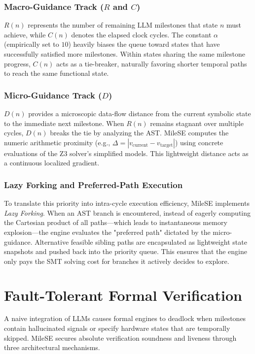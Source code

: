 \subsubsection{Macro-Guidance Track ($R$ and $C$)}
$R(n)$ represents the number of remaining LLM milestones that state $n$ must achieve, while $C(n)$ denotes the elapsed clock cycles. The constant $\alpha$ (empirically set to $10$) heavily biases the queue toward states that have successfully satisfied more milestones. Within states sharing the same milestone progress, $C(n)$ acts as a tie-breaker, naturally favoring shorter temporal paths to reach the same functional state.

\subsubsection{Micro-Guidance Track ($D$)}
$D(n)$ provides a microscopic data-flow distance from the current symbolic state to the immediate next milestone. When $R(n)$ remains stagnant over multiple cycles, $D(n)$ breaks the tie by analyzing the AST. MileSE computes the numeric arithmetic proximity (e.g., $\Delta = |v_{\text{current}} - v_{\text{target}}|$) using concrete evaluations of the Z3 solver's simplified models. This lightweight distance acts as a continuous localized gradient.

\subsubsection{Lazy Forking and Preferred-Path Execution}
To translate this priority into intra-cycle execution efficiency, MileSE implements \textit{Lazy Forking}. When an AST branch is encountered, instead of eagerly computing the Cartesian product of all paths—which leads to instantaneous memory explosion—the engine evaluates the "preferred path" dictated by the micro-guidance. Alternative feasible sibling paths are encapsulated as lightweight state snapshots and pushed back into the priority queue. This ensures that the engine only pays the SMT solving cost for branches it actively decides to explore.

\section{Fault-Tolerant Formal Verification}
\label{sec:fault_tolerance}
A naive integration of LLMs causes formal engines to deadlock when milestones contain hallucinated signals or specify hardware states that are temporally skipped. MileSE secures absolute verification soundness and liveness through three architectural mechanisms.

